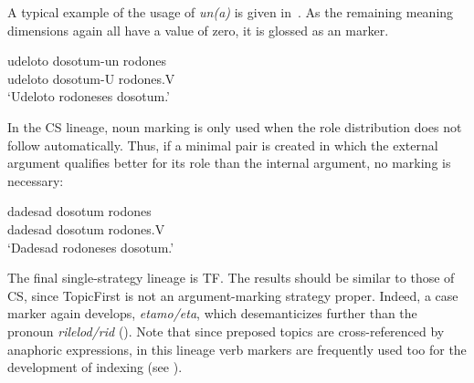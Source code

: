 \documentclass[output=paper]{LSP/langsci}
\begin{document}
A typical example of the usage of \textit{un(a)} is given in~. As the remaining meaning dimensions again all have a value of zero, it is glossed as an  marker.

\ea\label{17-le-ex:11}
\gll udeloto dosotum-un rodones\\
udeloto dosotum-U rodones.V\\
\glt `Udeloto rodoneses dosotum.'
\z


In the CS lineage, noun marking is only used when the role distribution does not follow automatically. Thus, if a minimal pair is created in which the external argument qualifies better for its role than the internal argument, no marking is necessary:

\ea\label{17-le-ex:12}
\gll dadesad dosotum rodones\\
dadesad dosotum rodones.V\\
\glt `Dadesad rodoneses dosotum.'
\z

The final single-strategy lineage is TF. The results should be similar to those of CS, since TopicFirst is not an argument-marking strategy proper. Indeed, a case marker again develops, \viz \textit{etamo/eta}, which desemanticizes further than the pronoun \textit{rilelod/rid} (). Note that since preposed topics are cross-referenced by anaphoric expressions, in this lineage verb markers are frequently used too for the development of indexing (see \citealt{Lestrade2015Simulating}).
 

\begin{table}
\caption{Representations of three most frequent words of the TF lineage\label{TF3}.}
\end{table}
\end{document}
